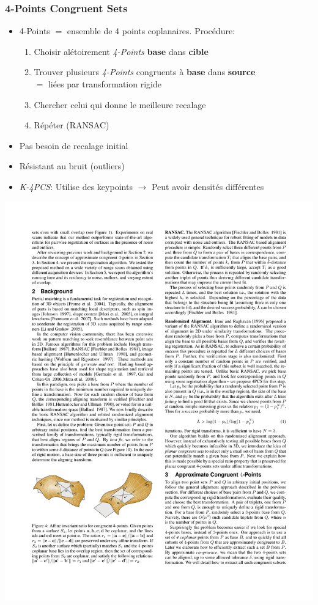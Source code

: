 \documentclass{beamer}
\begin{document}
\begin{frame}
\frametitle{4-Points Congruent Sets {\footnotesize \cite{Aige2008}}}
	\begin{itemize}
	\item {4-Points} $=$ ensemble de 4 points coplanaires. Procédure:
		\begin{enumerate}
		\item Choisir alétoirement \emph{4-Points} \textbf{base} dans \textbf{cible}
		\item Trouver plusieurs \emph{4-Points} congruents à \textbf{base} dans \textbf{source}
			\\ $=$ liées par transformation rigide
		\item Chercher celui qui donne le meilleure recalage
		\item Répéter (RANSAC)
		\end{enumerate}
	\item Pas besoin de recalage initial
	\item Résistant au bruit (outliers)
	\item \emph{K-4PCS}: Utilise des keypoints $\rightarrow$ Peut avoir densités différentes {\footnotesize \cite{Thei2013}}
	\end{itemize}
	\center \includegraphics[width=.7\textwidth]{4pcs.pdf} {\footnotesize \cite{Aige2008}}
\end{frame}


\footnotesize 
\end{document}
